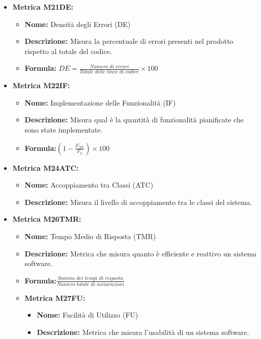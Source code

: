 \begin{itemize}
            \item \textbf{Metrica M21DE:}
                  \begin{itemize}
                      \item \textbf{Nome:} Densità degli Errori (DE)
                      \item \textbf{Descrizione:} Misura la percentuale di errori presenti nel prodotto rispetto al totale del codice.
                      \item \textbf{Formula:} $DE = \frac{\textit{Numero di errori}}{\textit{Totale delle linee di codice}} \times 100$
                  \end{itemize}

            \item \textbf{Metrica M22IF:}
                  \begin{itemize}
                      \item \textbf{Nome:} Implementazione delle Funzionalità (IF)
                      \item \textbf{Descrizione:} Misura qual è la quantità di funzionalità pianificate che sono state implementate.
                      \item \textbf{Formula:}$(1 - \frac{F_{NL}}{F_L}) \times 100$
                  \end{itemize}


            \item \textbf{Metrica M24ATC:}
                  \begin{itemize}
                      \item \textbf{Nome:} Accoppiamento tra Classi (ATC)
                      \item \textbf{Descrizione:} Misura il livello di accoppiamento tra le classi del sistema.
                  \end{itemize}


            \item \textbf{Metrica M26TMR:}
                  \begin{itemize}
                      \item \textbf{Nome:} Tempo Medio di Risposta (TMR)
                      \item \textbf{Descrizione:} Metrica che misura quanto è efficiente e reattivo un sistema software.
                      \item \textbf{Formula:}$\frac{\textit{Somma dei tempi di risposta}}{\textit{Numero totale di misurazioni}}$


            \item \textbf{Metrica M27FU:}
                  \begin{itemize}
                      \item \textbf{Nome:} Facilità di Utilizzo (FU)
                      \item \textbf{Descrizione:} Metrica che misura l'usabilità di un sistema software.



\end{itemize}
\end{itemize}
\end{itemize}
